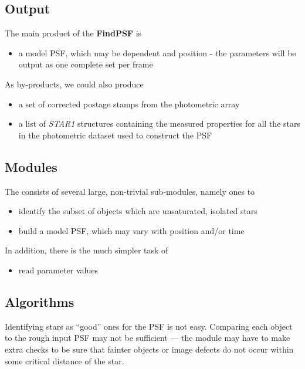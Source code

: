 \subsection {Output}

  The main product of the {\bf FindPSF} is 

\begin{itemize}
  \item a model PSF, which may be dependent and position - the parameters
will be output as one complete set per frame
\end{itemize}

As by-products, we could also produce

\begin{itemize}
  \item a set of corrected postage stamps from the photometric array
  \item a list of {\it STAR1} structures containing the 
        measured properties for all the
        stars in the photometric dataset used to construct the PSF
\end{itemize}

\subsection {Modules}

  The \fpsf consists of several large, non-trivial
sub-modules, namely ones to

\begin{itemize}
  \item identify the subset of objects which are unsaturated, 
        isolated stars 
  \item build a model PSF, which may vary with position and/or time
\end{itemize}

  In addition, there is the much simpler task of

\begin{itemize}
  \item read parameter values
\end{itemize}

\subsection {Algorithms}

Identifying stars as ``good'' ones for the PSF is not
easy.  Comparing each object to the rough input PSF may not
be sufficient --- the module may have to make extra checks
to be sure that fainter objects or image defects do not occur
within some critical distance of the star.

